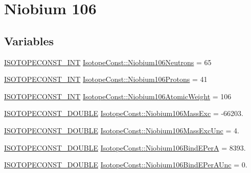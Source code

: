 \hypertarget{group___isotope_const-_niobium-_nb106}{}\section{Niobium 106}
\label{group___isotope_const-_niobium-_nb106}
\subsection*{Variables}
\begin{DoxyCompactItemize}
\item 
\mbox{\hyperlink{group___isotope_const-_macros_ga5f18360b3e99483a35c32d789e62621c}{I\+S\+O\+T\+O\+P\+E\+C\+O\+N\+S\+T\+\_\+\+I\+NT}} \mbox{\hyperlink{group___isotope_const-_niobium-_nb106_ga35d3e838613392b8c39d2f82e1fa2a35}{Isotope\+Const\+::\+Niobium106\+Neutrons}} = 65
\item 
\mbox{\hyperlink{group___isotope_const-_macros_ga5f18360b3e99483a35c32d789e62621c}{I\+S\+O\+T\+O\+P\+E\+C\+O\+N\+S\+T\+\_\+\+I\+NT}} \mbox{\hyperlink{group___isotope_const-_niobium-_nb106_ga22700db3a033d29899342c83f428b564}{Isotope\+Const\+::\+Niobium106\+Protons}} = 41
\item 
\mbox{\hyperlink{group___isotope_const-_macros_ga5f18360b3e99483a35c32d789e62621c}{I\+S\+O\+T\+O\+P\+E\+C\+O\+N\+S\+T\+\_\+\+I\+NT}} \mbox{\hyperlink{group___isotope_const-_niobium-_nb106_gae95367b5ec0920eba3e2839c75cfc37c}{Isotope\+Const\+::\+Niobium106\+Atomic\+Weight}} = 106
\item 
\mbox{\hyperlink{group___isotope_const-_macros_ga8f45a7272ce02c0b4c65c44636ed719a}{I\+S\+O\+T\+O\+P\+E\+C\+O\+N\+S\+T\+\_\+\+D\+O\+U\+B\+LE}} \mbox{\hyperlink{group___isotope_const-_niobium-_nb106_ga1be6be716bd9f41d0939bd06ad97ee54}{Isotope\+Const\+::\+Niobium106\+Mass\+Exc}} = -\/66203.
\item 
\mbox{\hyperlink{group___isotope_const-_macros_ga8f45a7272ce02c0b4c65c44636ed719a}{I\+S\+O\+T\+O\+P\+E\+C\+O\+N\+S\+T\+\_\+\+D\+O\+U\+B\+LE}} \mbox{\hyperlink{group___isotope_const-_niobium-_nb106_gadb7da85d50b8223423912a0614b09106}{Isotope\+Const\+::\+Niobium106\+Mass\+Exc\+Unc}} = 4.
\item 
\mbox{\hyperlink{group___isotope_const-_macros_ga8f45a7272ce02c0b4c65c44636ed719a}{I\+S\+O\+T\+O\+P\+E\+C\+O\+N\+S\+T\+\_\+\+D\+O\+U\+B\+LE}} \mbox{\hyperlink{group___isotope_const-_niobium-_nb106_gae108677e2125ce97ed77d77679cbf5fb}{Isotope\+Const\+::\+Niobium106\+Bind\+E\+PerA}} = 8393.
\item 
\mbox{\hyperlink{group___isotope_const-_macros_ga8f45a7272ce02c0b4c65c44636ed719a}{I\+S\+O\+T\+O\+P\+E\+C\+O\+N\+S\+T\+\_\+\+D\+O\+U\+B\+LE}} \mbox{\hyperlink{group___isotope_const-_niobium-_nb106_ga90bcae5afe32bbc5bd2e905fe4e2af87}{Isotope\+Const\+::\+Niobium106\+Bind\+E\+Per\+A\+Unc}} = 0.

\end{DoxyCompactItemize}
